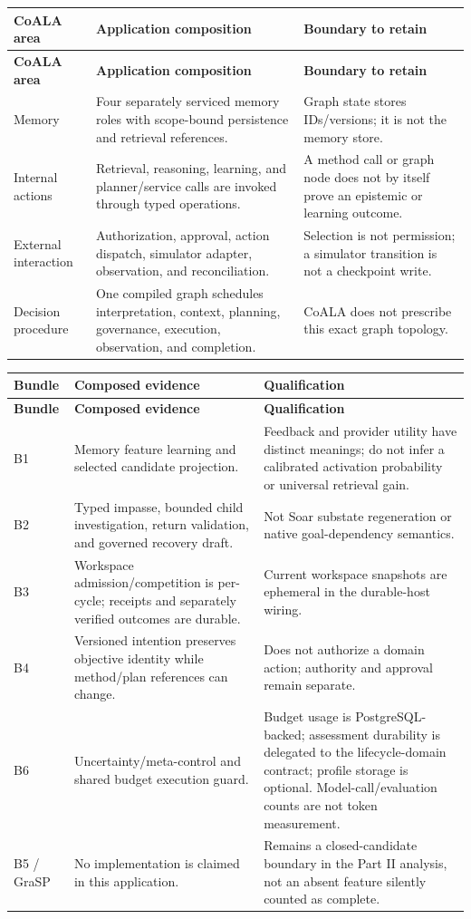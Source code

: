 \begin{longtable}{P{0.17\textwidth} P{0.38\textwidth} P{0.36\textwidth}}
\toprule
\textbf{CoALA area} & \textbf{Application composition} & \textbf{Boundary to retain} \\
\midrule
\endfirsthead
\toprule
\textbf{CoALA area} & \textbf{Application composition} & \textbf{Boundary to retain} \\
\midrule
\endhead
Memory & Four separately serviced memory roles with scope-bound persistence and retrieval references. & Graph state stores IDs/versions; it is not the memory store. \\
Internal actions & Retrieval, reasoning, learning, and planner/service calls are invoked through typed operations. & A method call or graph node does not by itself prove an epistemic or learning outcome. \\
External interaction & Authorization, approval, action dispatch, simulator adapter, observation, and reconciliation. & Selection is not permission; a simulator transition is not a checkpoint write. \\
Decision procedure & One compiled graph schedules interpretation, context, planning, governance, execution, observation, and completion. & CoALA does not prescribe this exact graph topology. \\
\bottomrule
\end{longtable}

\begin{longtable}{P{0.13\textwidth} P{0.39\textwidth} P{0.39\textwidth}}
\toprule
\textbf{Bundle} & \textbf{Composed evidence} & \textbf{Qualification} \\
\midrule
\endfirsthead
\toprule
\textbf{Bundle} & \textbf{Composed evidence} & \textbf{Qualification} \\
\midrule
\endhead
B1 & Memory feature learning and selected candidate projection. & Feedback and provider utility have distinct meanings; do not infer a calibrated activation probability or universal retrieval gain. \\
B2 & Typed impasse, bounded child investigation, return validation, and governed recovery draft. & Not Soar substate regeneration or native goal-dependency semantics. \\
B3 & Workspace admission/competition is per-cycle; receipts and separately verified outcomes are durable. & Current workspace snapshots are ephemeral in the durable-host wiring. \\
B4 & Versioned intention preserves objective identity while method/plan references can change. & Does not authorize a domain action; authority and approval remain separate. \\
B6 & Uncertainty/meta-control and shared budget execution guard. & Budget usage is PostgreSQL-backed; assessment durability is delegated to the lifecycle-domain contract; profile storage is optional. Model-call/evaluation counts are not token measurement. \\
B5 / GraSP & No implementation is claimed in this application. & Remains a closed-candidate boundary in the Part II analysis, not an absent feature silently counted as complete. \\
\bottomrule
\end{longtable}

